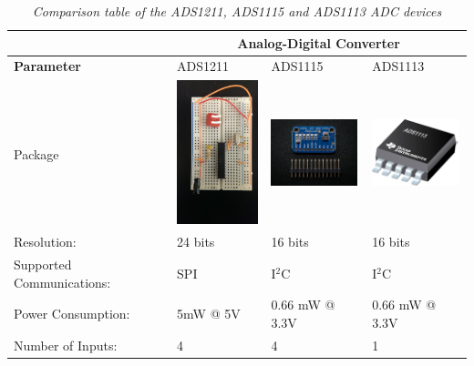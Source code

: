 \begin{table}[H]
\begin{center}
\begin{tabular}{|p{3cm}| p{3cm} | p{3cm} | p{3cm}|}
\hline
&\multicolumn{3}{c|}{\textbf{Analog-Digital Converter}}\\
\hline
\textbf{Parameter} & ADS1211 & ADS1115 & ADS1113\\
\hline
Package &\includegraphics[width = 2.5cm]{./KIRBY_Images/oldadc}
&
\includegraphics[width = 2.5cm]{./KIRBY_Images/ads1115} & \includegraphics[width = 2.5cm]{./KIRBY_Images/ADS1113_msop10}\\
\hline
Resolution: & 24 bits & 16 bits & 16 bits\\
\hline
Supported Communications:&	 SPI & I$^2$C & I$^2$C \\
\hline
Power Consumption:&	5mW @ 5V	& 0.66 mW @ 3.3V & 0.66 mW @ 3.3V\\
\hline
Number of Inputs: & 4 & 4 & 1\\
\hline

\end{tabular}
\caption{\textit{Comparison table of the ADS1211, ADS1115 and ADS1113 ADC devices}}
\label{tab:ADC_Compare}
\end{center}
\end{table}


